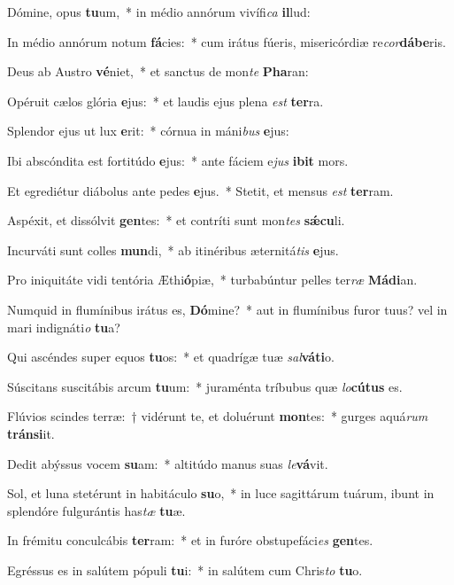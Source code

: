 \item Dómine, opus \textbf{tu}um,~* in médio annórum vivífi\textit{ca} \textbf{il}lud:
\item In médio annórum notum \textbf{fá}cies:~* cum irátus fúeris, misericórdiæ re\textit{cor}\textbf{dá}\textbf{be}ris.
\item Deus ab Austro \textbf{vé}niet,~* et sanctus de mon\textit{te} \textbf{Pha}ran:
\item Opéruit cælos glória \textbf{e}jus:~* et laudis ejus plena \textit{est} \textbf{ter}ra.
\item Splendor ejus ut lux \textbf{e}rit:~* córnua in máni\textit{bus} \textbf{e}jus:
\item Ibi abscóndita est fortitúdo \textbf{e}jus:~* ante fáciem e\textit{jus} \textbf{i}\textbf{bit} mors.
\item Et egrediétur diábolus ante pedes \textbf{e}jus.~* Stetit, et mensus \textit{est} \textbf{ter}ram.
\item Aspéxit, et dissólvit \textbf{gen}tes:~* et contríti sunt mon\textit{tes} \textbf{sǽ}\textbf{cu}li.
\item Incurváti sunt colles \textbf{mun}di,~* ab itinéribus æternitá\textit{tis} \textbf{e}jus.
\item Pro iniquitáte vidi tentória Æthi\textbf{ó}piæ,~* turbabúntur pelles ter\textit{ræ} \textbf{Má}\textbf{di}an.
\item Numquid in flumínibus irátus es, \textbf{Dó}mine?~* aut in flumínibus furor tuus? vel in mari indignáti\textit{o} \textbf{tu}a?
\item Qui ascéndes super equos \textbf{tu}os:~* et quadrígæ tuæ \textit{sal}\textbf{vá}\textbf{ti}o.
\item Súscitans suscitábis arcum \textbf{tu}um:~* juraménta tríbubus quæ \textit{lo}\textbf{cú}\textbf{tus} es.
\item Flúvios scindes terræ:~† vidérunt te, et doluérunt \textbf{mon}tes:~* gurges aquá\textit{rum} \textbf{tráns}\textbf{i}it.
\item Dedit abýssus vocem \textbf{su}am:~* altitúdo manus suas \textit{le}\textbf{vá}vit.
\item Sol, et luna stetérunt in habitáculo \textbf{su}o,~* in luce sagittárum tuárum, ibunt in splendóre fulgurántis has\textit{tæ} \textbf{tu}æ.
\item In frémitu conculcábis \textbf{ter}ram:~* et in furóre obstupefáci\textit{es} \textbf{gen}tes.
\item Egréssus es in salútem pópuli \textbf{tu}i:~* in salútem cum Chris\textit{to} \textbf{tu}o.
